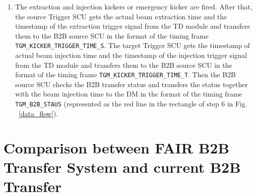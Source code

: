 \begin{enumerate}
\item  The extraction and injection kickers or emergency kicker are fired. After that, the source Trigger SCU gets the actual beam extraction time and the timestamp of the extraction trigger signal from the TD module and transfers them to the B2B source SCU in the format of the timing frame \verb|TGM_KICKER_TRIGGER_TIME_S|. The target Trigger SCU gets the timestamp of actual beam injection time and the timestamp of the injection trigger signal from the TD module and transfers them to the B2B source SCU in the format of the timing frame \verb|TGM_KICKER_TRIGGER_TIME_T|. Then the B2B source SCU checks the B2B transfer status and transfers the status together with the beam injection time to the DM in the format of the timing frame \verb|TGM_B2B_STAUS| (represented as the red line in the rectangle of step 6 in Fig. ~\ref{data_flow}).

\end{enumerate}

\section{Comparison between FAIR B2B Transfer System and current B2B Transfer}
\label{cpt_comp}


